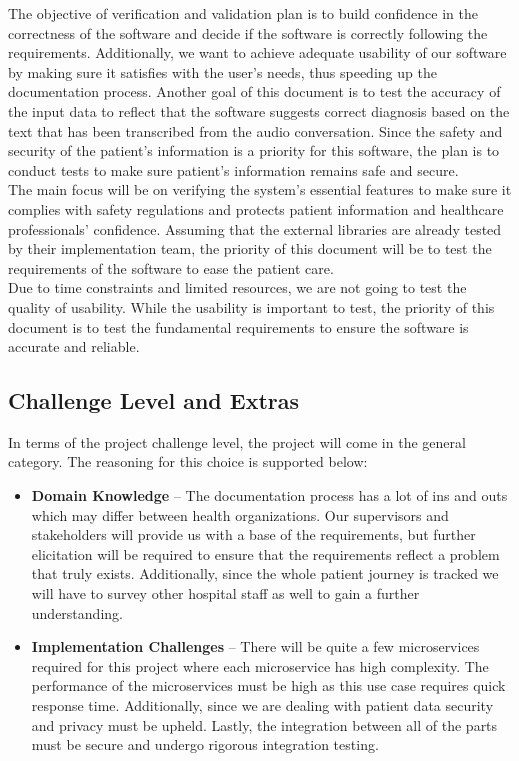 \documentclass[12pt, titlepage]{article}
\begin{document}
The objective of verification and validation plan is to build confidence in the correctness of the software and decide if the software is correctly following the requirements. Additionally, we want to achieve adequate usability of our software by making sure it satisfies with the user's needs, thus speeding up the documentation process. Another goal of this document is to test the accuracy of the input data to reflect that the software suggests correct diagnosis based on the text that has been transcribed from the audio conversation. Since the safety and security of the patient's information is a priority for this software, the plan is to conduct tests to make sure patient's information remains safe and secure.\\
The main focus will be on verifying the system's essential features to make sure it complies with safety regulations and protects patient information and healthcare professionals' confidence. Assuming that the external libraries are already tested by their implementation team, the priority of this document will be to test the requirements of the software to ease the patient care.\\
Due to time constraints and limited resources, we are not going to test the quality of usability. While the usability is important to test, the priority of this document is to test the fundamental requirements to ensure the software is accurate and reliable. 

\subsection{Challenge Level and Extras} \label{section:2.3}

In terms of the project challenge level, the project will come in the general category. The reasoning for this choice is supported below:

\begin{itemize}
  \item\textbf{Domain Knowledge} -- The documentation process has a lot of ins and outs which may differ between health organizations. Our supervisors and stakeholders will provide us with a base of the requirements, but further elicitation will be required to ensure that the requirements reflect a problem that truly exists. Additionally, since the whole patient journey is tracked we will have to survey other hospital staff as well to gain a further understanding. 
  \item\textbf{Implementation Challenges} -- There will be quite a few microservices required for this project where each microservice has high complexity. The performance of the microservices must be high as this use case requires quick response time. Additionally, since we are dealing with patient data security and privacy must be upheld. Lastly, the integration between all of the parts must be secure and undergo rigorous integration testing.
\end{itemize}
\end{document}
